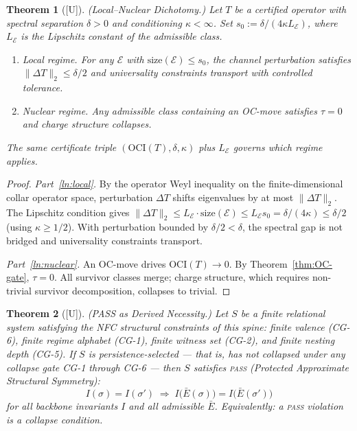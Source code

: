 \documentclass[12pt,oneside]{amsbook}
\theoremstyle{plain}
\newtheorem{theorem}{Theorem}[section]
\theoremstyle{definition}
\theoremstyle{remark}
\newcommand{\status}[1]{\textup{[#1]}}
\begin{document}
\begin{theorem}[\status{U}]\label{thm:local-nuclear}
\textup{(Local--Nuclear Dichotomy.)}  Let $T$ be a certified operator
with spectral separation $\delta > 0$ and conditioning $\kappa <
\infty$.  Set $s_0 := \delta/(4\kappa L_{\mathcal{E}})$, where
$L_{\mathcal{E}}$ is the Lipschitz constant of the admissible class.
\begin{enumerate}[label=\textup{(\alph*)}]
  \item\label{ln:local} \emph{Local regime.}  For any $\mathcal{E}$
        with $\mathrm{size}(\mathcal{E}) \leq s_0$, the channel
        perturbation satisfies $\|\Delta T\|_2 \leq \delta/2$ and
        universality constraints transport with controlled tolerance.
  \item\label{ln:nuclear} \emph{Nuclear regime.}  Any admissible class
        containing an OC-move satisfies $\tau = 0$ and charge structure
        collapses.
\end{enumerate}
The same certificate triple $(\mathrm{OCI}(T), \delta, \kappa)$ plus
$L_{\mathcal{E}}$ governs which regime applies.
\end{theorem}

\begin{proof}
\emph{Part~\ref{ln:local}.}  By the operator Weyl inequality on the
finite-dimensional collar operator space, perturbation $\Delta T$ shifts
eigenvalues by at most $\|\Delta T\|_2$.  The Lipschitz condition
gives $\|\Delta T\|_2 \leq L_{\mathcal{E}} \cdot \mathrm{size}(\mathcal{E})
\leq L_{\mathcal{E}} s_0 = \delta/(4\kappa) \leq \delta/2$
(using $\kappa \geq 1/2$).  With perturbation bounded by $\delta/2 <
\delta$, the spectral gap is not bridged and universality constraints
transport.

\emph{Part~\ref{ln:nuclear}.}  An OC-move drives $\mathrm{OCI}(T) \to
0$.  By Theorem~\ref{thm:OC-gate}, $\tau = 0$.  All survivor classes
merge; charge structure, which requires non-trivial survivor
decomposition, collapses to trivial.
\end{proof}


\begin{theorem}[\status{U}]\label{thm:PASS}
\textup{(PASS as Derived Necessity.)}  Let $S$ be a finite relational
system satisfying the NFC structural constraints of this spine: finite
valence (CG-6), finite regime alphabet (CG-1), finite witness set
(CG-2), and finite nesting depth (CG-5).  If $S$ is
\emph{persistence-selected} — that is, has not collapsed under any
collapse gate CG-1 through CG-6 — then $S$ satisfies
\textsc{pass} (Protected Approximate Structural Symmetry):
\[
  I(\sigma) = I(\sigma')
  \;\Longrightarrow\;
  I\!\bigl(\bar{E}(\sigma)\bigr) = I\!\bigl(\bar{E}(\sigma')\bigr)
\]
for all backbone invariants $I$ and all admissible $\bar{E}$.
Equivalently: a \textsc{pass} violation is a collapse condition.
\end{theorem}
\end{document}
